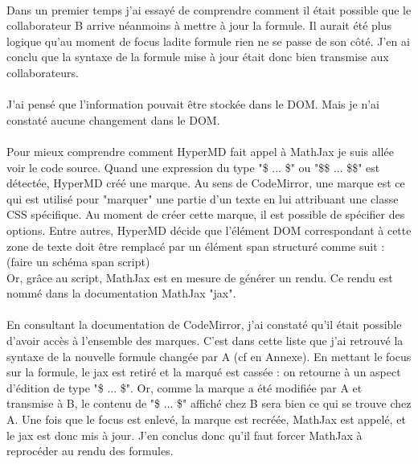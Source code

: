 \documentclass[12pt]{article}
\begin{document}
\paragraph{}
Dans un premier temps j'ai essayé de comprendre comment il était possible que le collaborateur B arrive néanmoins à mettre à jour la formule. Il aurait été plus logique qu'au moment de focus ladite formule rien ne se passe de son côté. J'en ai conclu que la syntaxe de la formule mise à jour était donc bien transmise aux collaborateurs.
\paragraph{}
J'ai pensé que l'information pouvait être stockée dans le DOM. Mais je n'ai constaté aucune changement dans le DOM.
\paragraph{}
Pour mieux comprendre comment HyperMD fait appel à MathJax je suis allée voir le code source. Quand une expression du type "\$ ... \$" ou "\$\$ ... \$\$" est détectée, HyperMD créé une marque. Au sens de CodeMirror, une marque est ce qui est utilisé pour "marquer" une partie d'un texte en lui attribuant une classe CSS spécifique. Au moment de créer cette marque, il est possible de spécifier des options. Entre autres, HyperMD décide que l'élément DOM correspondant à cette zone de texte doit être remplacé par un élément span structuré comme suit :
(faire un schéma span
    script)\\
Or, grâce au script, MathJax est en mesure de générer un rendu. Ce rendu est nommé dans la documentation MathJax "jax".
\paragraph{}
En consultant la documentation de CodeMirror, j'ai constaté qu'il était possible d'avoir accès à l'ensemble des marques. C'est dans cette liste que j'ai retrouvé la syntaxe de la nouvelle formule changée par A (cf en Annexe). En mettant le focus sur la formule, le jax est retiré et la marqué est cassée : on retourne à un aspect d'édition de type "\$ ... \$". Or, comme la marque a été modifiée par A et transmise à B, le contenu de "\$ ... \$" affiché chez B sera bien ce qui se trouve chez A. Une fois que le focus est enlevé, la marque est recréée, MathJax est appelé, et le jax est donc mis à jour. J'en conclus donc qu'il faut forcer MathJax à reprocéder au rendu des formules.\\
\end{document}
